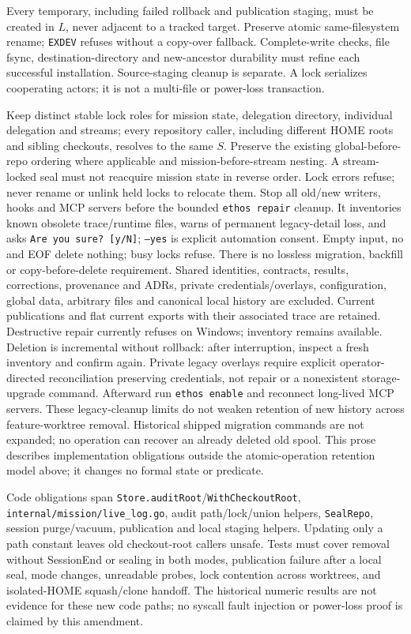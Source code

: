 \documentclass[a4paper,10pt,fleqn]{article}
\newcommand{\fpath}[1]{\nolinkurl{#1}}
\newcommand{\field}[1]{\ifmmode\texttt{#1}\else\texorpdfstring{\breakfield{#1}}{#1}\fi}
\begin{document}
Every temporary, including failed rollback and publication staging,
must be created in $L$, never adjacent to a tracked target. Preserve
atomic same-filesystem rename; \texttt{EXDEV} refuses without a copy-over
fallback. Complete-write checks, file fsync, destination-directory and
new-ancestor durability must refine each successful installation.
Source-staging cleanup is separate. A lock serializes cooperating
actors; it is not a multi-file or power-loss transaction.

Keep distinct stable lock roles for mission state, delegation directory,
individual delegation and streams; every repository caller, including
different HOME roots and sibling checkouts, resolves to the same $S$.
Preserve the existing global-before-repo ordering where applicable and
mission-before-stream nesting. A stream-locked seal must not reacquire
mission state in reverse order. Lock errors refuse; never rename or
unlink held locks to relocate them. Stop all old/new writers, hooks and
MCP servers before the bounded \texttt{ethos repair} cleanup. It inventories
known obsolete trace/runtime files, warns of permanent legacy-detail loss,
and asks \texttt{Are you sure? [y/N]}; \texttt{--yes} is explicit automation
consent. Empty input, no and EOF delete nothing; busy locks refuse. There is
no lossless migration, backfill or copy-before-delete requirement. Shared
identities, contracts, results, corrections, provenance and ADRs, private
credentials/overlays, configuration, global data, arbitrary files and canonical
local history are excluded. Current publications and flat current exports
with their associated trace are retained. Destructive repair currently refuses
on Windows; inventory remains available. Deletion is incremental without
rollback: after interruption, inspect a fresh inventory and confirm again.
Private legacy overlays require explicit operator-directed reconciliation
preserving credentials, not repair or a nonexistent storage-upgrade command.
Afterward run \texttt{ethos enable} and reconnect long-lived MCP servers.
These legacy-cleanup limits do not weaken retention of new history across
feature-worktree removal. Historical shipped migration commands are not expanded;
no operation can recover an already deleted old spool. This prose describes
implementation obligations outside the atomic-operation retention model above;
it changes no formal state or predicate.

Code obligations span \field{Store.auditRoot}/\field{WithCheckoutRoot},
\fpath{internal/mission/live_log.go}, audit path/lock/union helpers,
\field{SealRepo}, session purge/vacuum, publication and local staging
helpers. Updating only a path constant leaves old checkout-root callers
unsafe. Tests must cover removal without SessionEnd or sealing in both
modes, publication failure after a local seal, mode changes, unreadable
probes, lock contention across worktrees, and isolated-HOME squash/clone
handoff. The historical numeric results are not evidence for these
new code paths; no syscall fault injection or power-loss proof is
claimed by this amendment.
\end{document}

